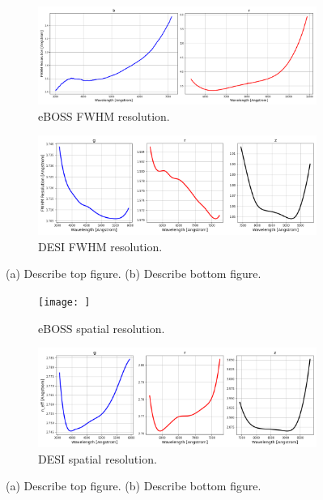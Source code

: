 \begin{figure}[h]
\centering
\begin{subfigure}[b]{0.55\textwidth}
   \includegraphics[width=14cm]{images/specsim/eboss_resolution.png}
   \caption{eBOSS FWHM resolution.}
   \label{fig:eboss_fwhm} 
\end{subfigure}

\begin{subfigure}[b]{0.55\textwidth}
   \includegraphics[width=14cm]{images/specsim/desi_resolution.png}
   \caption{DESI FWHM resolution.}
   \label{fig:desi_fwhm}
\end{subfigure}
\caption[Two numerical solutions]{(a) Describe top figure. (b) Describe bottom figure.}
\end{figure}

\begin{figure}[h]
\centering
\begin{subfigure}[b]{0.55\textwidth}
   \texttt{[image: ]}
   \caption{eBOSS spatial resolution.}
   \label{fig:eboss_neff} 
\end{subfigure}

\begin{subfigure}[b]{0.55\textwidth}
   \includegraphics[width=14cm]{images/specsim/desi_neff.png}
   \caption{DESI spatial resolution.}
   \label{fig:desi_neff}
\end{subfigure}
\caption[Two numerical solutions]{(a) Describe top figure. (b) Describe bottom figure.}
\end{figure}

